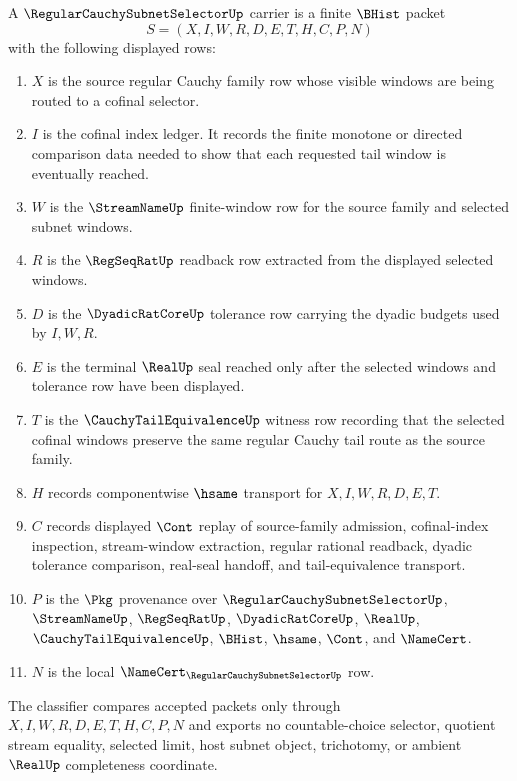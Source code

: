 \begin{definition}
\label{def:regular-cauchy-subnet-selector-carrier}
A $\RegularCauchySubnetSelectorUp$ carrier is a finite $\BHist$ packet
$$
S=(X,I,W,R,D,E,T,H,C,P,N)
$$
with the following displayed rows:
\begin{enumerate}
\item $X$ is the source regular Cauchy family row whose visible windows are being routed to a cofinal selector.
\item $I$ is the cofinal index ledger. It records the finite monotone or directed comparison data needed to show that each requested tail window is eventually reached.
\item $W$ is the $\StreamNameUp$ finite-window row for the source family and selected subnet windows.
\item $R$ is the $\RegSeqRatUp$ readback row extracted from the displayed selected windows.
\item $D$ is the $\DyadicRatCoreUp$ tolerance row carrying the dyadic budgets used by $I,W,R$.
\item $E$ is the terminal $\RealUp$ seal reached only after the selected windows and tolerance row have been displayed.
\item $T$ is the $\CauchyTailEquivalenceUp$ witness row recording that the selected cofinal windows preserve the same regular Cauchy tail route as the source family.
\item $H$ records componentwise $\hsame$ transport for $X,I,W,R,D,E,T$.
\item $C$ records displayed $\Cont$ replay of source-family admission, cofinal-index inspection, stream-window extraction, regular rational readback, dyadic tolerance comparison, real-seal handoff, and tail-equivalence transport.
\item $P$ is the $\Pkg$ provenance over $\RegularCauchySubnetSelectorUp$, $\StreamNameUp$, $\RegSeqRatUp$, $\DyadicRatCoreUp$, $\RealUp$, $\CauchyTailEquivalenceUp$, $\BHist$, $\hsame$, $\Cont$, and $\NameCert$.
\item $N$ is the local $\NameCert_{\RegularCauchySubnetSelectorUp}$ row.
\end{enumerate}
The classifier compares accepted packets only through $X,I,W,R,D,E,T,H,C,P,N$ and exports no countable-choice selector, quotient stream equality, selected limit, host subnet object, trichotomy, or ambient $\RealUp$ completeness coordinate.
\end{definition}

